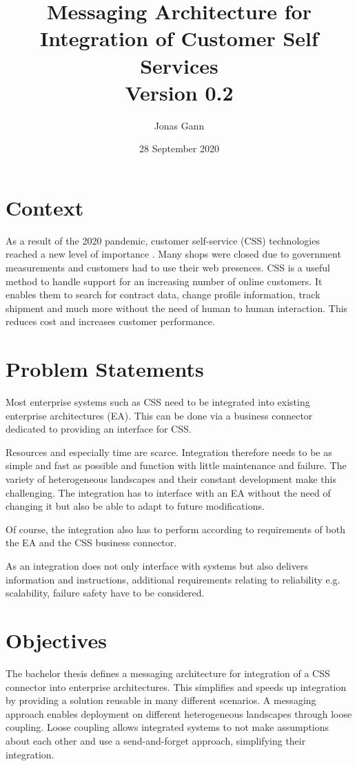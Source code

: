 \documentclass{article}
\title{Messaging Architecture for Integration of Customer Self Services \\ Version 0.2}
\author{Jonas Gann}
\date{28 September 2020}
\begin{document}
\maketitle

\section{Context}
As a result of the 2020 pandemic, customer self-service (CSS) technologies reached a new level of importance \cite{covid}.
Many shops were closed due to government measurements and customers had to use their web
presences. CSS is a useful method to handle support for an increasing number of online customers. It enables them to search 
for contract data, change profile information, track shipment and much more without the need of human to human interaction.
This reduces cost and increases customer performance.

\section{Problem Statements}

Most enterprise systems such as CSS need to be integrated into existing enterprise architectures (EA).
This can be done via a business connector dedicated to providing an interface for CSS. 

Resources and especially time are scarce. Integration therefore needs to be as simple and fast as possible and 
function with little maintenance and failure. The variety of heterogeneous landscapes and their constant 
development make this challenging. The integration has to interface with an EA without the need of changing it but also be able to 
adapt to future modifications.

Of course, the integration also has to perform according to requirements of both the EA and the CSS business connector.

As an integration does not only interface with systems but also delivers information and instructions, additional requirements 
relating to reliability e.g. scalability, failure safety have to be considered.

\section{Objectives}

The bachelor thesis defines a messaging architecture for integration of a CSS connector 
into enterprise architectures. This simplifies and speeds up integration by providing a solution reusable in many 
different scenarios. A messaging approach enables deployment on different heterogeneous landscapes through 
loose coupling. Loose coupling allows integrated systems to not make assumptions about each other and use a 
send-and-forget approach, simplifying their integration.
\end{document}
